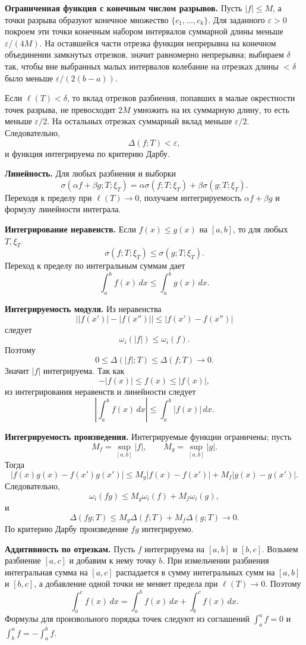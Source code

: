 \documentclass[12pt,a4paper]{article}
\newcommand{\eps}{\varepsilon}
\newcommand{\dd}{\,d}
\newcommand{\mesh}{\ell}
\newcommand{\osc}{\omega}
\begin{document}
\textbf{Ограниченная функция с конечным числом разрывов.}
Пусть \(|f|\le M\), а точки разрыва образуют конечное множество
\(\{c_1,\dots,c_k\}\). Для заданного \(\eps>0\) покроем эти точки конечным
набором интервалов суммарной длины меньше \(\eps/(4M)\). На оставшейся части
отрезка функция непрерывна на конечном объединении замкнутых отрезков, значит
равномерно непрерывна; выбираем \(\delta\) так, чтобы вне выбранных малых
интервалов колебание на отрезках длины \(<\delta\) было меньше
\(\eps/(2(b-a))\).

Если \(\mesh(T)<\delta\), то вклад отрезков разбиения, попавших в малые
окрестности точек разрыва, не превосходит \(2M\) умножить на их суммарную
длину, то есть меньше \(\eps/2\). На остальных отрезках суммарный вклад меньше
\(\eps/2\). Следовательно,
\[
  \Delta(f;T)<\eps,
\]
и функция интегрируема по критерию Дарбу.

\textbf{Линейность.}
Для любых разбиения и выборки
\[
  \sigma(\alpha f+\beta g;T;\xi_T)
  =
  \alpha\sigma(f;T;\xi_T)+\beta\sigma(g;T;\xi_T).
\]
Переходя к пределу при \(\mesh(T)\to0\), получаем интегрируемость
\(\alpha f+\beta g\) и формулу линейности интеграла.

\textbf{Интегрирование неравенств.}
Если \(f(x)\le g(x)\) на \([a,b]\), то для любых \(T,\xi_T\)
\[
  \sigma(f;T;\xi_T)\le\sigma(g;T;\xi_T).
\]
Переход к пределу по интегральным суммам дает
\[
  \int_a^b f(x)\dd x\le\int_a^b g(x)\dd x.
\]

\textbf{Интегрируемость модуля.}
Из неравенства
\[
  \bigl||f(x')|-|f(x'')|\bigr|\le |f(x')-f(x'')|
\]
следует
\[
  \osc_i(|f|)\le\osc_i(f).
\]
Поэтому
\[
  0\le\Delta(|f|;T)\le\Delta(f;T)\to0.
\]
Значит \(|f|\) интегрируема. Так как
\[
  -|f(x)|\le f(x)\le |f(x)|,
\]
из интегрирования неравенств и линейности следует
\[
  \left|\int_a^b f(x)\dd x\right|
  \le
  \int_a^b |f(x)|\dd x.
\]

\textbf{Интегрируемость произведения.}
Интегрируемые функции ограничены; пусть
\[
  M_f=\sup_{[a,b]}|f|,\qquad M_g=\sup_{[a,b]}|g|.
\]
Тогда
\[
  |f(x)g(x)-f(x')g(x')|
  \le
  M_g|f(x)-f(x')|+M_f|g(x)-g(x')|.
\]
Следовательно,
\[
  \osc_i(fg)\le M_g\osc_i(f)+M_f\osc_i(g),
\]
и
\[
  \Delta(fg;T)
  \le
  M_g\Delta(f;T)+M_f\Delta(g;T)\to0.
\]
По критерию Дарбу произведение \(fg\) интегрируемо.

\textbf{Аддитивность по отрезкам.}
Пусть \(f\) интегрируема на \([a,b]\) и \([b,c]\). Возьмем разбиение
\([a,c]\) и добавим к нему точку \(b\). При измельчении разбиения
интегральная сумма на \([a,c]\) распадается в сумму интегральных сумм на
\([a,b]\) и \([b,c]\), а добавление одной точки не меняет предела при
\(\mesh(T)\to0\). Поэтому
\[
  \int_a^c f(x)\dd x
  =
  \int_a^b f(x)\dd x+\int_b^c f(x)\dd x.
\]
Формулы для произвольного порядка точек следуют из соглашений
\(\int_a^a f=0\) и \(\int_b^a f=-\int_a^b f\).
\end{document}
